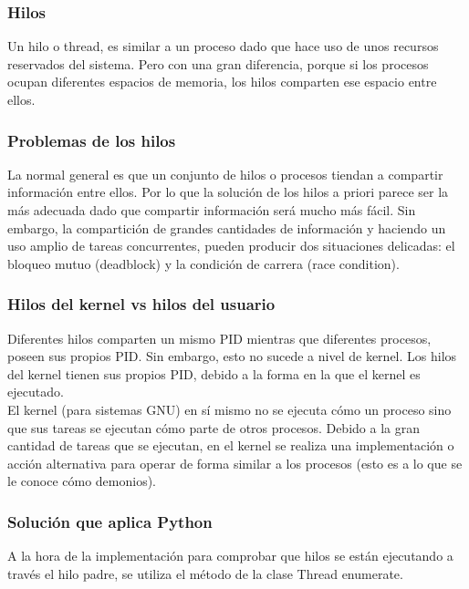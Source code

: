 \subsubsection{Hilos}

Un hilo o thread, es similar a un proceso dado que hace uso de unos recursos reservados del sistema. Pero con una gran diferencia, porque si los procesos ocupan diferentes espacios de memoria, los hilos comparten ese espacio entre ellos.

\subsubsection{Problemas de los hilos}

La normal general es que un conjunto de hilos o procesos tiendan a compartir información entre ellos. Por lo que la solución de los hilos a priori parece ser la más adecuada dado que compartir información será mucho más fácil. Sin embargo, la compartición de grandes cantidades de información y haciendo un uso amplio de tareas concurrentes, pueden producir dos situaciones delicadas: el bloqueo mutuo (deadblock) y la condición de carrera (race condition).\\

\subsubsection{Hilos del kernel vs hilos del usuario}

Diferentes hilos comparten un mismo PID mientras que diferentes procesos, poseen sus propios PID. Sin embargo, esto no sucede a nivel de kernel. Los hilos del kernel tienen sus propios PID, debido a la forma en la que el kernel es ejecutado.\\

El kernel (para sistemas GNU) en sí mismo no se ejecuta cómo un proceso sino que sus tareas se ejecutan cómo parte de otros procesos. Debido a la gran cantidad de tareas que se ejecutan, en el kernel se realiza una implementación o acción alternativa para operar de forma similar a los procesos (esto es a lo que se le conoce cómo demonios).\\

\subsubsection{Solución que aplica Python}

A la hora de la implementación para comprobar que hilos se están ejecutando a través el hilo padre, se utiliza el método de la clase Thread enumerate.\\

